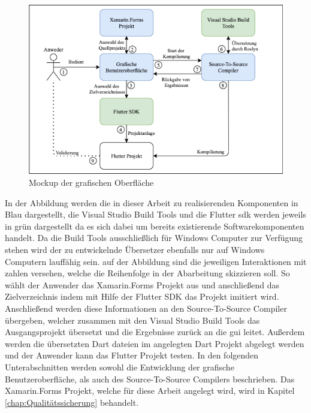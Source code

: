 \begin{figure}[!ht]
 \includegraphics[width=\textwidth,keepaspectratio]{Images/Implementation/IDE.png}
 \caption{Mockup der grafischen Oberfläche}
 \label{fig:IDE}
\end{figure}
\newpage
In der Abbildung werden die in dieser Arbeit zu realisierenden Komponenten in Blau dargestellt,  die Visual Studio Build Tools und die Flutter \ac{sdk} werden jeweils in grün dargestellt da es sich dabei um bereits existierende Softwarekomponenten handelt.  Da die Build Tools ausschließlich für Windows Computer zur Verfügung stehen wird der zu entwickelnde Übersetzer ebenfalls nur auf Windows Computern lauffähig sein.  auf der Abbildung sind die jeweiligen Interaktionen mit zahlen versehen,  welche die Reihenfolge in der Abarbeitung skizzieren soll.  So wählt der Anwender das Xamarin.Forms Projekt aus und anschließend das Zielverzeichnis indem mit Hilfe der Flutter SDK das Projekt imitiert wird.  Anschließend werden diese Informationen an den Source-To-Source Compiler übergeben, welcher zusammen mit den Visual Studio Build Tools das Ausgangsprojekt übersetzt und die Ergebnisse zurück an die \ac{gui} leitet.  Außerdem werden die übersetzten Dart dateien im angelegten Dart Projekt abgelegt werden und der Anwender kann das Flutter Projekt testen.  
In den folgenden Unterabschnitten werden sowohl die Entwicklung der grafische Benutzeroberfläche, als auch des Source-To-Source Compilers beschrieben.  Das Xamarin.Forms Projekt, welche für diese Arbeit angelegt wird, wird in Kapitel \ref{chap:Qualitätssicherung} behandelt. 



